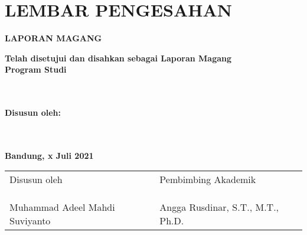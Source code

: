 \chapter*{LEMBAR PENGESAHAN} %


\begin{center} %
	\large
	\textbf{LAPORAN MAGANG}
	\bigskip
	
	\Large
	\textbf{\JUDUL}
	\bigskip
	
	\bigskip
	\bigskip
	\bigskip
	
	\normalsize
	\textbf{Telah disetujui dan disahkan sebagai Laporan Magang}\\
	\textbf{Program Studi \prodi}\\
	\textbf{\fakultas}\\
	\textbf{\universitas}\\
	\bigskip
	\bigskip
	
	\textbf{Disusun oleh:}\\
	\textbf{\PENULIS}\\
	\textbf{\nim}\\
	\bigskip
	\bigskip
	
	\textbf{Bandung, x Juli 2021}\\
	\begin{tabular}{|p{6cm}|p{6cm}|}
		\hline
		Disusun oleh & Pembimbing Akademik \\
		& \\
		& \\
		& \\
		Muhammad Adeel Mahdi Suviyanto & Angga Rusdinar, S.T., M.T., Ph.D. \\
		\hline
	\end{tabular}
\end{center}

